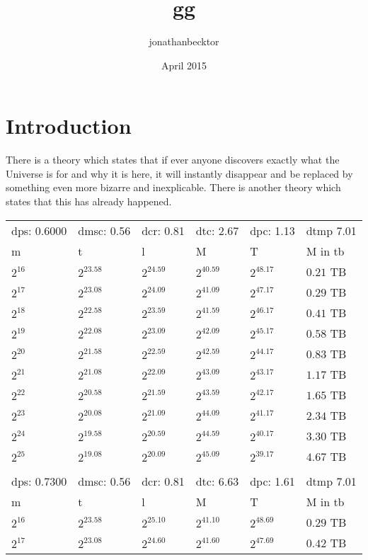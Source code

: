 \documentclass{article}
\title{gg}
\author{jonathanbecktor }
\date{April 2015}
\begin{document}
\maketitle

\section{Introduction}
There is a theory which states that if ever anyone discovers exactly what the Universe is for and why it is here, it will instantly disappear and be replaced by something even more bizarre and inexplicable.
There is another theory which states that this has already happened.\\
\begin{tabular}{llllll}
dps: 0.6000 & dmsc: 0.56 & dcr: 0.81 & dtc: 2.67 & dpc: 1.13 & dtmp 7.01 \\
m & t & l & M & T & M in tb \\
$2^{16}$ & $2^{23.58}$ & $2^{24.59}$ & $2^{40.59}$ & $2^{48.17}$ & $0.21$ TB \\
$2^{17}$ & $2^{23.08}$ & $2^{24.09}$ & $2^{41.09}$ & $2^{47.17}$ & $0.29$ TB \\
$2^{18}$ & $2^{22.58}$ & $2^{23.59}$ & $2^{41.59}$ & $2^{46.17}$ & $0.41$ TB \\
$2^{19}$ & $2^{22.08}$ & $2^{23.09}$ & $2^{42.09}$ & $2^{45.17}$ & $0.58$ TB \\
$2^{20}$ & $2^{21.58}$ & $2^{22.59}$ & $2^{42.59}$ & $2^{44.17}$ & $0.83$ TB \\
$2^{21}$ & $2^{21.08}$ & $2^{22.09}$ & $2^{43.09}$ & $2^{43.17}$ & $1.17$ TB \\
$2^{22}$ & $2^{20.58}$ & $2^{21.59}$ & $2^{43.59}$ & $2^{42.17}$ & $1.65$ TB \\
$2^{23}$ & $2^{20.08}$ & $2^{21.09}$ & $2^{44.09}$ & $2^{41.17}$ & $2.34$ TB \\
$2^{24}$ & $2^{19.58}$ & $2^{20.59}$ & $2^{44.59}$ & $2^{40.17}$ & $3.30$ TB \\
$2^{25}$ & $2^{19.08}$ & $2^{20.09}$ & $2^{45.09}$ & $2^{39.17}$ & $4.67$ TB \\
 &  &  &  &  &  \\
dps: 0.7300 & dmsc: 0.56 & dcr: 0.81 & dtc: 6.63 & dpc: 1.61 & dtmp 7.01 \\
m & t & l & M & T & M in tb \\
$2^{16}$ & $2^{23.58}$ & $2^{25.10}$ & $2^{41.10}$ & $2^{48.69}$ & $0.29$ TB \\
$2^{17}$ & $2^{23.08}$ & $2^{24.60}$ & $2^{41.60}$ & $2^{47.69}$ & $0.42$ TB \\

\end{tabular}
\end{document}
